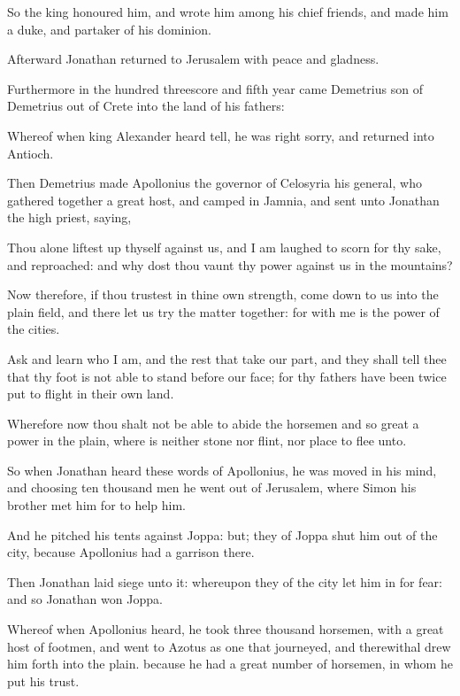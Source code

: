 {\par }{\PP {}So the king honoured him, and wrote him among his chief friends, and made him a duke, and partaker of his dominion.
\par }{\PP {}Afterward Jonathan returned to Jerusalem with peace and gladness.
\par }{\PP {}Furthermore in the hundred threescore and fifth year came Demetrius son of Demetrius out of Crete into the land of his fathers:
\par }{\PP {}Whereof when king Alexander heard tell, he was right sorry, and returned into Antioch.
\par }{\PP {}Then Demetrius made Apollonius the governor of Celosyria his general, who gathered together a great host, and camped in Jamnia, and sent unto Jonathan the high priest, saying,
\par }{\PP {}Thou alone liftest up thyself against us, and I am laughed to scorn for thy sake, and reproached: and why dost thou vaunt thy power against us in the mountains?
\par }{\PP {}Now therefore, if thou trustest in thine own strength, come down to us into the plain field, and there let us try the matter together: for with me is the power of the cities.
\par }{\PP {}Ask and learn who I am, and the rest that take our part, and they shall tell thee that thy foot is not able to stand before our face; for thy fathers have been twice put to flight in their own land.
\par }{\PP {}Wherefore now thou shalt not be able to abide the horsemen and so great a power in the plain, where is neither stone nor flint, nor place to flee unto.
\par }{\PP {}So when Jonathan heard these words of Apollonius, he was moved in his mind, and choosing ten thousand men he went out of Jerusalem, where Simon his brother met him for to help him.
\par }{\PP {}And he pitched his tents against Joppa: but; they of Joppa shut him out of the city, because Apollonius had a garrison there.
\par }{\PP {}Then Jonathan laid siege unto it: whereupon they of the city let him in for fear: and so Jonathan won Joppa.
\par }{\PP {}Whereof when Apollonius heard, he took three thousand horsemen, with a great host of footmen, and went to Azotus as one that journeyed, and therewithal drew him forth into the plain. because he had a great number of horsemen, in whom he put his trust.
}

